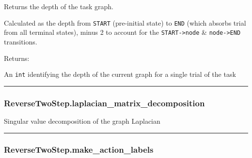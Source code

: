 \begin{Shaded}
\begin{Highlighting}[]
\NormalTok{)}
\end{Highlighting}
\end{Shaded}

Returns the depth of the task graph.

Calculated as the depth from \texttt{START} (pre-initial state) to
\texttt{END} (which absorbs trial from all terminal states), minus 2 to
account for the \texttt{START-\textgreater{}node} \&
\texttt{node-\textgreater{}END} transitions.

Returns:

An \texttt{int} identifying the depth of the current graph for a single
trial of the task

\begin{center}\rule{0.5\linewidth}{\linethickness}\end{center}

\hypertarget{reversetwostep.laplacian_matrix_decomposition}{%
\subsubsection{ReverseTwoStep.laplacian\_matrix\_decomposition}\label{reversetwostep.laplacian_matrix_decomposition}}

\begin{Shaded}
\begin{Highlighting}[]
\NormalTok{)}
\end{Highlighting}
\end{Shaded}

Singular value decomposition of the graph Laplacian

\begin{center}\rule{0.5\linewidth}{\linethickness}\end{center}

\hypertarget{reversetwostep.make_action_labels}{%
\subsubsection{ReverseTwoStep.make\_action\_labels}\label{reversetwostep.make_action_labels}}

\begin{Shaded}
\begin{Highlighting}[]
\NormalTok{)}
\end{Highlighting}
\end{Shaded}

